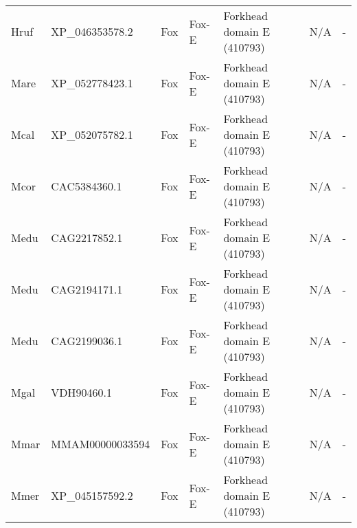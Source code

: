 \documentclass[../main.tex]{subfiles}
\begin{document}
\begin{landscape}
\begin{longtable}{lllllll}
		Hruf           & XP\_046353578.2       & Fox            & Fox-E               & Forkhead domain E (410793)                  & N/A                                                                    & -                    \\
		Mare           & XP\_052778423.1       & Fox            & Fox-E               & Forkhead domain E (410793)                  & N/A                                                                    & -                    \\
		Mcal           & XP\_052075782.1       & Fox            & Fox-E               & Forkhead domain E (410793)                  & N/A                                                                    & -                    \\
		Mcor           & CAC5384360.1          & Fox            & Fox-E               & Forkhead domain E (410793)                  & N/A                                                                    & -                    \\
		Medu           & CAG2217852.1          & Fox            & Fox-E               & Forkhead domain E (410793)                  & N/A                                                                    & -                    \\
		Medu           & CAG2194171.1          & Fox            & Fox-E               & Forkhead domain E (410793)                  & N/A                                                                    & -                    \\
		Medu           & CAG2199036.1          & Fox            & Fox-E               & Forkhead domain E (410793)                  & N/A                                                                    & -                    \\
		Mgal           & VDH90460.1            & Fox            & Fox-E               & Forkhead domain E (410793)                  & N/A                                                                    & -                    \\
		Mmar           & MMAM00000033594       & Fox            & Fox-E               & Forkhead domain E (410793)                  & N/A                                                                    & -                    \\
		Mmer           & XP\_045157592.2       & Fox            & Fox-E               & Forkhead domain E (410793)                  & N/A                                                                    & -                    \\

\end{longtable}
\end{landscape}
\end{document}
